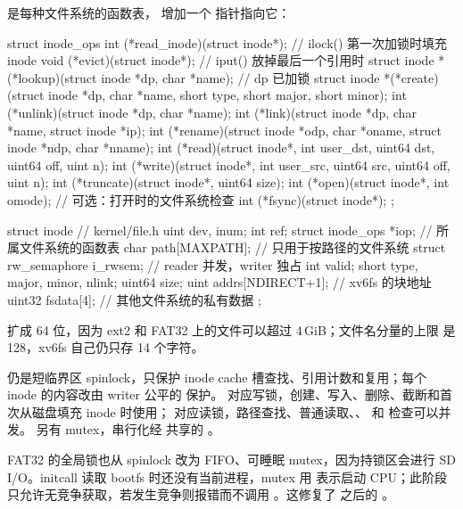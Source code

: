  是每种文件系统的函数表， 增加一个  指针指向它：

\begin{ccode}
struct inode_ops {
  int  (*read_inode)(struct inode*);             // ilock() 第一次加锁时填充 inode
  void (*evict)(struct inode*);                  // iput() 放掉最后一个引用时
  struct inode *(*lookup)(struct inode *dp, char *name);   // dp 已加锁
  struct inode *(*create)(struct inode *dp, char *name,
                          short type, short major, short minor);
  int  (*unlink)(struct inode *dp, char *name);
  int  (*link)(struct inode *dp, char *name, struct inode *ip);
  int  (*rename)(struct inode *odp, char *oname, struct inode *ndp, char *nname);
  int  (*read)(struct inode*, int user_dst, uint64 dst, uint64 off, uint n);
  int  (*write)(struct inode*, int user_src, uint64 src, uint64 off, uint n);
  int  (*truncate)(struct inode*, uint64 size);
  int  (*open)(struct inode*, int omode);        // 可选：打开时的文件系统检查
  int  (*fsync)(struct inode*);
};

struct inode {                   // kernel/file.h
  uint dev, inum;  int ref;
  struct inode_ops *iop;         // 所属文件系统的函数表
  char path[MAXPATH];            // 只用于按路径的文件系统
  struct rw_semaphore i_rwsem;   // reader 并发，writer 独占
  int valid;
  short type, major, minor, nlink;  uint64 size;
  uint addrs[NDIRECT+1];         // xv6fs 的块地址
  uint32 fsdata[4];              // 其他文件系统的私有数据
};
\end{ccode}

 扩成 64 位，因为 ext2 和 FAT32 上的文件可以超过 4\,GiB；文件名分量的上限  是 128，xv6fs 自己仍只存 14 个字符。

 仍是短临界区 spinlock，只保护 inode cache 槽查找、引用计数和复用；每个 inode 的内容改由 writer 公平的  保护。 对应写锁，创建、写入、删除、截断和首次从磁盘填充 inode 时使用； 对应读锁，路径查找、普通读取、、 和  检查可以并发。 另有  mutex，串行化经  共享的 。

FAT32 的全局锁也从 spinlock 改为 FIFO、可睡眠 mutex，因为持锁区会进行 SD I/O。initcall 读取 bootfs 时还没有当前进程，mutex 用  表示启动 CPU；此阶段只允许无竞争获取，若发生竞争则报错而不调用 。这修复了  之后的 。

